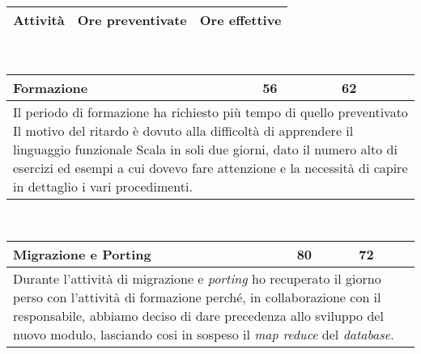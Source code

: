 \newpage
\begin{table}[h]
	\begin{tabular}{|p{}|p{}|p{}|}
		\toprule
		
		\textbf{Attività} & \textbf{Ore preventivate} & \textbf{Ore effettive} \\
		\bottomrule
	\end{tabular}\\	
\end{table}

\begin{table}[h]
	\begin{tabular}{|p{}|p{}|p{}|}
		\toprule
		\textbf{Formazione} & \textbf{56} & \textbf{62}  \\ \midrule
		\multicolumn{3}{|p{1\textwidth}|}{Il periodo di formazione ha richiesto più tempo di quello preventivato Il motivo del ritardo è dovuto alla difficoltà di apprendere il linguaggio funzionale Scala in soli due giorni, dato il numero alto di esercizi ed esempi a cui dovevo fare attenzione e la necessità di capire in dettaglio i vari procedimenti.} \\
		\bottomrule
	\end{tabular}\\
	\par\bigskip
	
	\begin{tabular}{|p{}|p{}|p{}|}
		\toprule
		\textbf{Migrazione e Porting} & \textbf{80} & \textbf{72}  \\ \midrule
		\multicolumn{3}{|p{1\textwidth}|}{Durante l'attività di migrazione e \textit{porting} ho recuperato il giorno perso con l'attività di formazione perché, in collaborazione con il responsabile, abbiamo deciso di dare precedenza allo sviluppo del nuovo modulo, lasciando cosi in sospeso il \textit{map reduce} del \textit{database}.} \\
		\bottomrule
	\end{tabular}\\
	\par\bigskip
	

\end{table}
